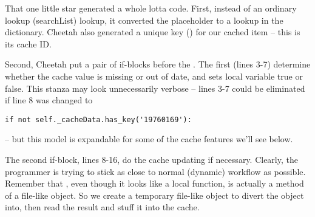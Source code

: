 That one little star generated a whole lotta code.  First, instead of an 
ordinary  lookup (searchList) lookup, it converted the
placeholder to a lookup in the  dictionary.  Cheetah also
generated a unique key () for our cached item -- this is its
cache ID.

Second, Cheetah put a pair of if-blocks before the .  The first
(lines 3-7) determine whether the cache value is missing or out of date, and
sets local variable  true or false.
This stanza may look unnecessarily verbose -- lines 3-7 could be eliminated if
line 8 was changed to
\begin{verbatim}
if not self._cacheData.has_key('19760169'):
\end{verbatim}
-- but this model is expandable for some of the cache features we'll see below.

The second if-block, lines 8-16, do the cache updating if necessary.
Clearly, the programmer is trying to stick as close to normal (dynamic)
workflow as possible.  Remember that , even though it looks like a
local function, is actually a method of a file-like object.  So we create a
temporary file-like object to divert the  object into, then read
the result and stuff it into the cache.

